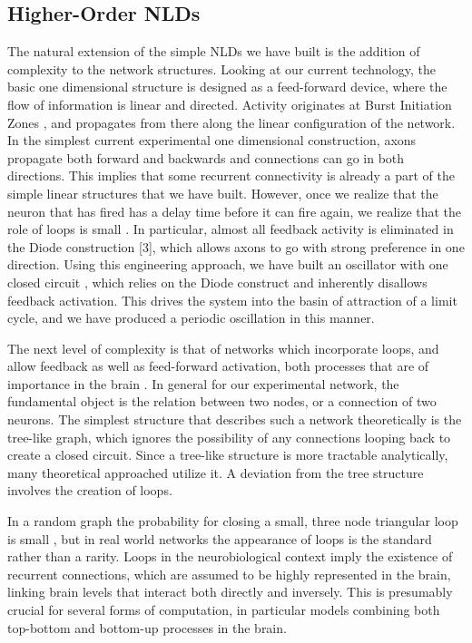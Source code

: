 \subsection{Higher-Order NLDs}
The natural extension of the simple NLDs we have built is the addition of complexity to the network structures. Looking at our current technology, the basic one dimensional structure is designed as a feed-forward device, where the flow of information is linear and directed. Activity originates at Burst Initiation Zones \cite{Feinerman2007}, and propagates from there along the linear configuration of the network. In the simplest current experimental one dimensional construction, axons propagate both forward and backwards and connections can go in both directions. This implies that some recurrent connectivity is already a part of the simple linear structures that we have built. However, once we realize that the neuron that has fired has a delay time before it can fire again, we realize that the role of loops is small \cite{Feinerman2006}. In particular, almost all feedback activity is eliminated in the Diode construction [3], which allows axons to go with strong preference in one direction. Using this engineering approach, we have built an oscillator with one closed circuit \cite{Feinerman2008}, which relies on the Diode construct and inherently disallows feedback activation. This drives the system into the basin of attraction of a limit cycle, and we have produced a periodic oscillation in this manner.

The next level of complexity is that of networks which incorporate loops, and allow feedback as well as feed-forward activation, both processes that are of importance in the brain \cite{Ahissar2003}. In general for our experimental network, the fundamental object is the relation between two nodes, or a connection of two neurons. The simplest structure that describes such a network theoretically is the tree-like graph, which ignores the possibility of any connections looping back to create a closed circuit. Since a tree-like structure is more tractable analytically, many theoretical approached utilize it. A deviation from the tree structure involves the creation of loops.

In a random graph the probability for closing a small, three node triangular loop is small \cite{Vazquez2004}, but in real world networks \cite{Eckmann2002} the appearance of loops is the standard rather than a rarity. Loops in the neurobiological context imply the existence of recurrent connections, which are assumed to be highly represented in the brain, linking brain levels that interact both directly and inversely. This is presumably crucial for several forms of computation, in particular models combining both top-bottom and bottom-up processes in the brain. 

